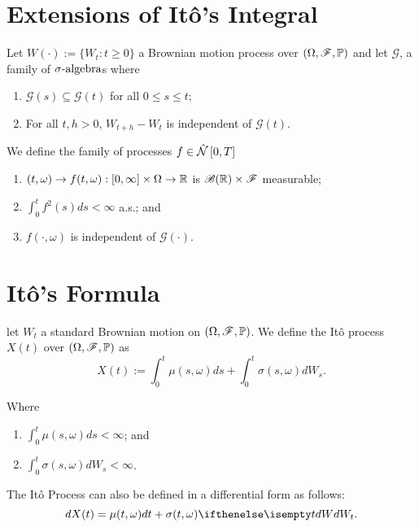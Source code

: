 \documentclass[../TGMAFFIRO.tex]{subfiles}
\begin{document}
\section{Extensions of It\^o's Integral}
\begin{definition}
	Let $W(\cdot) := \{W_t : t\geq 0\}$ a Brownian motion process over $(\Omega, \mathscr{F}, \mathbb{P})$ and let $\mathscr{G}$, a family of $\sigma\text{-algebra}$s where
	\begin{enumerate}
		\item $\mathscr{G}(s) \subseteq \mathscr{G}(t)$ for all $0\leq s \leq t$;
		\item For all $t, h > 0$, $W_{t+h} - W_t$ is independent of $\mathscr{G}(t)$.
	\end{enumerate}
	We define the family of processes $f\in\hat{\mathcal{N}}\left[0, T\right]$
	\begin{enumerate}
		\item $(t, \omega) \to f(t, \omega):[0, \infty]\times\Omega \to \mathbb{R}$ is $\mathscr{B}(\mathbb{R})\times\mathscr{F}$ measurable;
		\item $\int_0^t f^2(s) ds < \infty$ a.s.; and
		\item $f(\cdot, \omega)$ is independent of $\mathscr{G}(\cdot)$.
	\end{enumerate}
\end{definition}

\section{It\^o's Formula}

\begin{definition}\label{def:ito_process}
	let $W_t$ a standard Brownian motion on $(\Omega, \mathscr{F}, \mathbb{P})$. We define the It\^o process $X(t)$ over $(\Omega, \mathscr{F}, \mathbb{P})$ as
	\begin{equation}
		X(t) := \int_0^t\mu(s,\omega) ds  + \int_0^t\sigma(s,\omega) dW_s.
	\end{equation}
	
	Where
	\begin{enumerate}
		\item $\int_0^t \mu(s,\omega) ds < \infty$; and
		\item $\int_0^t\sigma(s,\omega) dW_s < \infty$.
	\end{enumerate}
	
	The It\^o Process can also be defined in a differential form as follows:
	\begin{equation}
		dX(t) = \mu(t, \omega) dt + \sigma(t, \omega) \dW[t].
	\end{equation}
\end{definition}
\end{document}
